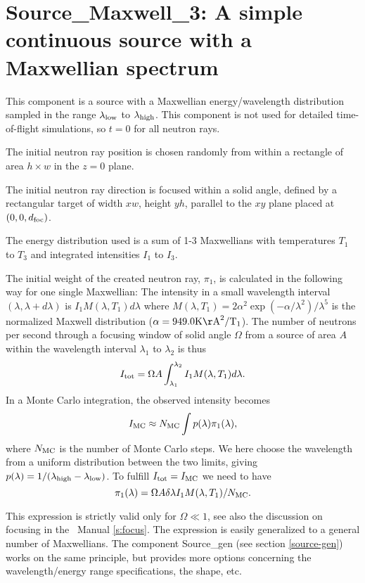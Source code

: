 \section{Source\_Maxwell\_3: A simple continuous source
with a Maxwellian spectrum}
\label{source-maxwell}


This component is a source with a Maxwellian energy/wavelength distribution
sampled in the range $\lambda_{\rm low}$ to $\lambda_{\rm high}$.
This component is not used for detailed time-of-flight simulations,
so $t=0$ for all neutron rays.

The initial neutron ray position is chosen randomly from within a
rectangle of area $h \times w$ in the $z=0$ plane.

The initial neutron ray direction is focused within
a solid angle, defined by a rectangular target of width
$xw$, height $yh$, parallel to
the $xy$ plane placed at $(0,0,d_{\rm foc})$.

The energy distribution used is a sum of 1-3 Maxwellians with
temperatures $T_1$ to $T_3$ and integrated intensities $I_1$ to $I_3$.

The initial weight of the created neutron ray, $\pi_1$, is
calculated in the following way for one single Maxwellian:
The intensity in a small wavelength interval $(\lambda, \lambda+d\lambda)$ is
$ I_1 M(\lambda,T_1) d\lambda $
where
$M(\lambda,T_1) = 2 \alpha^2 \exp(-\alpha/\lambda^2) / \lambda^5 $ is the normalized Maxwell distribution ($\alpha=949.0 \rm{K \AA}^2/T_1$).
The number of neutrons per second through a focusing window
of solid angle $\Omega$
from a source of area $A$ within the wavelength interval $\lambda_1$ to
$\lambda_2$ is thus
\begin{equation}
I_{\rm tot} = \Omega A \int_{\lambda_1}^{\lambda_2} I_1 M(\lambda,T_1) d\lambda.
\end{equation}
In a Monte Carlo integration, the observed intensity becomes
\begin{equation}
I_{\rm MC} \approx N_{\rm MC} \int p(\lambda) \pi_1(\lambda) ,
\end{equation}
where $N_{\rm MC}$ is the number of Monte Carlo steps.
We here choose the wavelength from a uniform distribution between the two
limits, giving $p(\lambda)=1/(\lambda_{\rm high}-\lambda_{\rm low})$.
To fulfill $I_{\rm tot} = I_{\rm MC}$ we need to have
\begin{equation}
\pi_1(\lambda) = \Omega A \delta\lambda I_1 M(\lambda,T_1) / N_{\rm MC} .
\end{equation}

This expression is strictly valid only for $\Omega \ll 1$,
see also the discussion on focusing in the \MCS\ Manual \ref{s:focus}.
The expression is easily generalized to a general number of Maxwellians.
The component Source\_gen (see section \ref{source-gen}) works on the same principle, but provides more options concerning the wavelength/energy range specifications, the shape, etc.
